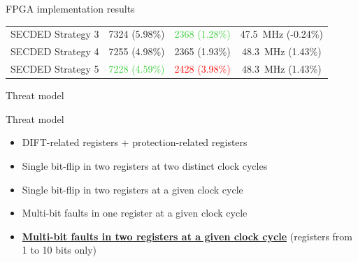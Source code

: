 \begin{frame}{FPGA implementation results}
\begin{table}[t]
\begin{tabular}{@{}rccc@{}}
            SECDED Strategy 3          & \num{7324} {\tiny (5.98\%)}                        & \textcolor{LimeGreen}{\num{2368} {\tiny (1.28\%)}} & \SI{47.5}{\mega\hertz} {\tiny (-0.24\%)} \\
            SECDED Strategy 4          & \num{7255} {\tiny (4.98\%)}                        & \num{2365} {\tiny (1.93\%)}                        & \SI{48.3}{\mega\hertz} {\tiny (1.43\%) } \\
            SECDED Strategy 5          & \textcolor{LimeGreen}{\num{7228} {\tiny (4.59\%)}} & \textcolor{red}{\num{2428} {\tiny (3.98\%)}}       & \SI{48.3}{\mega\hertz} {\tiny (1.43\%) } \\
            \bottomrule
        \end{tabular}
    \end{table}
\end{frame}
\begin{frame}{Threat model}
    \begin{block}{Threat model}
        \begin{itemize}
            \item<1> DIFT-related registers + protection-related registers
            \item<2> Single bit-flip in two registers at two distinct clock cycles%
            \item<3> Single bit-flip in two registers at a given clock cycle%
            \item<4> Multi-bit faults in one register at a given clock cycle%
            \item<5> \textbf{\underline{Multi-bit faults in two registers at a given clock cycle}} {\tiny (registers from 1 to 10 bits only)}%
        \end{itemize}
    \end{block}
\end{frame}
